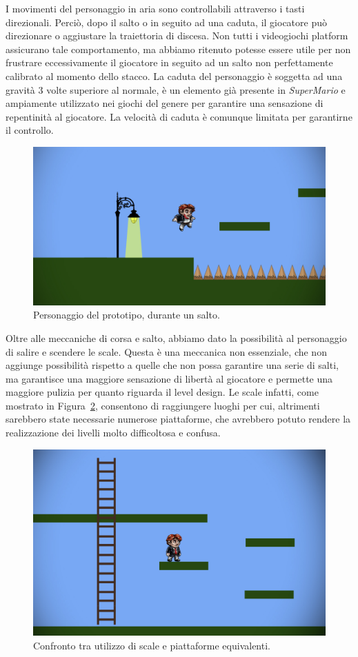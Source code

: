 I movimenti del personaggio in aria sono controllabili attraverso i tasti direzionali. Perciò, dopo il salto o in seguito ad una caduta, il giocatore può direzionare o aggiustare la traiettoria di discesa. Non tutti i videogiochi platform assicurano tale comportamento, ma abbiamo ritenuto potesse essere utile per non frustrare eccessivamente il giocatore in seguito ad un salto non perfettamente calibrato al momento dello stacco.
La caduta del personaggio è soggetta ad una gravità 3 volte superiore al normale, è un elemento già presente in \textit{SuperMario} e ampiamente utilizzato nei giochi del genere per garantire una sensazione di repentinità al giocatore. La velocità di caduta è comunque limitata per garantirne il controllo.

\begin{figure}%
	\centering
	\includegraphics[width= 0.8\columnwidth]{images/gameDesign/05.jpg}
	\caption{Personaggio del prototipo, durante un salto.}
	\label{fig:platform_salto}
\end{figure}

Oltre alle meccaniche di corsa e salto, abbiamo dato la possibilità al personaggio di salire e scendere le scale. Questa è una meccanica non essenziale, che non aggiunge possibilità rispetto a quelle che non possa garantire una serie di salti, ma garantisce una maggiore sensazione di libertà al giocatore e permette una maggiore pulizia per quanto riguarda il level design. Le scale infatti, come mostrato in Figura~\ref{fig:platform_scala_piattaforme}, consentono di raggiungere luoghi per cui, altrimenti sarebbero state necessarie numerose piattaforme, che avrebbero potuto rendere la realizzazione dei livelli molto difficoltosa e confusa.

\begin{figure}%
	\centering
	\includegraphics[width= 0.8\columnwidth]{images/gameDesign/06.jpg}
	\caption{Confronto tra utilizzo di scale e piattaforme equivalenti.}
	\label{fig:platform_scala_piattaforme}
\end{figure}

